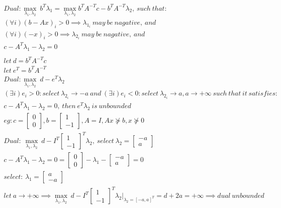 \documentclass[12pt,letter]{article}
\begin{document}
\begin{enumerate}
\begin{itemize}
\begin{align*}
      &Dual: \max_{\lambda_1,\lambda_2}\ b^T\lambda_1 = \max_{\lambda_1,\lambda_2} b^TA^{-T}c-b^TA^{-T}\lambda_2,\ such\ that:\\
      &(\forall i) (b-Ax)_i > 0 \implies \lambda_{1_i}\ may\ be\ nagative,\ and\\
      &(\forall i) (-x)_i > 0 \implies \lambda_{2_i}\ may\ be\ nagative,\ and\\
      &c - A^T\lambda_1 - \lambda_2 = 0\\
      \\
      &let\ d = b^TA^{-T}c\\
      &let\ e^T = b^TA^{-T}\\
      &Dual: \max_{\lambda_1,\lambda_2}\ d-e^T\lambda_2\\
      &(\exists i) e_i > 0: select\ \lambda_{2_i} \to -a \ and\ (\exists i) e_i < 0: select\ \lambda_{2_i} \to a, a \to +\infty \ such\ that\ it\ satisfies:\\
      &c - A^T\lambda_1 - \lambda_2 = 0,\ then\ e^T\lambda_2\ is\ unbounded\\
      &eg: c=\begin{bmatrix}0\\0\end{bmatrix}, b=\begin{bmatrix}1\\-1\end{bmatrix},A=I, Ax \not\succeq b, x \not\succeq 0\\
      &Dual:\ \max_{\lambda_1,\lambda_2}\ d- I^T\begin{bmatrix}1\\-1\end{bmatrix}^T\lambda_2,\ select\ \lambda_2 =\begin{bmatrix}-a\\a\end{bmatrix}\\
      &c-A^T\lambda_1-\lambda_2 =0=\begin{bmatrix}0\\0\end{bmatrix} - \lambda_1 - \begin{bmatrix}-a\\a\end{bmatrix} = 0\\
      &select:\ \lambda_1 =\begin{bmatrix}a\\-a\end{bmatrix}\\
      &let\ a \to +\infty \implies \max_{\lambda_1,\lambda_2}\ d - I^T\begin{bmatrix}1\\-1\end{bmatrix}^T\lambda_2\bigg|_{\lambda_2=[-a,a]^T} = d + 2a = +\infty \implies dual\ unbounded\\

\end{align*}
\end{itemize}
\end{enumerate}
\end{document}
